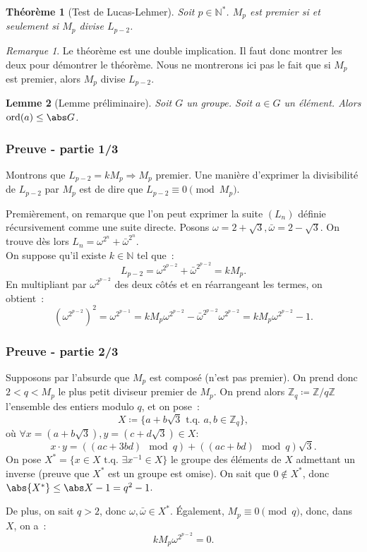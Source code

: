 \documentclass[10pt, mathserif]{beamer}
\DeclareMathOperator{\ord}{ord}
\newcommand{\tq}{\text{ t.q. }}
\newcommand{\Z}{\mathbb Z}
\newcommand{\N}{\mathbb N}
\newtheorem{thm}{Théorème}[section]
\newtheorem{lem}[thm]{Lemme}
\theoremstyle{definition}
\theoremstyle{remark}
\newtheorem*{rmq}{Remarque}
\begin{document}
	\begin{frame}
		\begin{thm}[Test de Lucas-Lehmer]
			Soit $p \in \N^*$. $M_p$ est premier si et seulement si $M_p$ divise $L_{p-2}$.
		\end{thm}

		\begin{rmq}
			Le théorème est une double implication. Il faut donc montrer les deux pour démontrer le théorème. Nous ne montrerons ici pas le fait que si $M_p$
			est premier, alors $M_p$ divise $L_{p-2}$.
		\end{rmq}

		\begin{lem}[Lemme préliminaire]
			Soit $G$ un groupe. Soit $a \in G$ un élément. Alors $\ord(a) \leq \abs G$.
		\end{lem}
	\end{frame}

	\begin{frame}
		\frametitle{Preuve - partie 1/3}

		Montrons que $L_{p-2} = kM_p \Rightarrow M_p$ premier. Une manière d'exprimer la divisibilité de $L_{p-2}$ par $M_p$ est de dire que
		$L_{p-2} \equiv 0 \pmod {M_p}$.

		Premièrement, on remarque que l'on peut exprimer la suite $(L_n)$ définie récursivement comme une suite directe. Posons
		$\omega = 2 + \sqrt 3, \bar \omega = 2 - \sqrt 3$. On trouve dès lors $L_n = \omega^{2^n} + \bar \omega^{2^n}$. \\

		On suppose qu'il existe $k \in \N$ tel que~:
		\[L_{p-2} = \omega^{2^{p-2}} + \bar \omega^{2^{p-2}} = kM_p.\]
		En multipliant par $\omega^{2^{p-2}}$ des deux côtés et en réarrangeant les termes, on obtient~:
		\[\left(\omega^{2^{p-2}}\right)^2 = \omega^{2^{p-1}} = kM_p\omega^{2^{p-2}} - \bar \omega^{2^{p-2}}\omega^{2^{p-2}} = kM_p\omega^{2^{p-2}} - 1.\]
	\end{frame}

	\begin{frame}
		\frametitle{Preuve - partie 2/3}

		Supposons par l'absurde que $M_p$ est composé (n'est pas premier). On prend donc $2 < q < M_p$ le plus petit diviseur premier de $M_p$. On prend
		alors $\Z_q \coloneqq \Z/q\Z$ l'ensemble des entiers modulo $q$, et on pose~:
		\[X \coloneqq \{a + b\sqrt 3 \tq a, b \in \Z_q\},\]
		où $\forall x = (a+b\sqrt 3), y = (c+d\sqrt 3) \in X :$
		\[x \cdot y = \left((ac+3bd) \mod q\right) + \left((ac+bd) \mod q\right)\sqrt 3.\]
		On pose $X^* = \{x \in X \tq \exists x^{-1} \in X\}$ le groupe des éléments de $X$ admettant un inverse (preuve que $X^*$ est un groupe est omise).
		On sait que $0 \not \in X^*$, donc $\abs {X^*} \leq \abs X -1=q^2 - 1$.

		De plus, on sait $q > 2$, donc $\omega, \bar \omega \in X^*$. Également, $M_p \equiv 0 \pmod q$, donc, dans $X$, on a~:
		\[kM_p\omega^{2^{p-2}} = 0.\]
	\end{frame}
	
\end{document}
